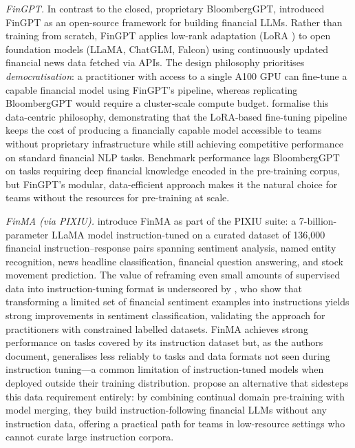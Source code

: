 \textit{FinGPT.}  In contrast to the closed, proprietary BloombergGPT,
\citet{Yang2023} introduced FinGPT as an open-source framework for
building financial LLMs.  Rather than training from scratch, FinGPT applies
low-rank adaptation (LoRA \cite{hu2022lora}) to open foundation models
(LLaMA, ChatGLM, Falcon) using continuously updated financial news data fetched
via APIs.  The design philosophy prioritises \emph{democratisation}: a practitioner
with access to a single A100 GPU can fine-tune a capable financial model using
FinGPT's pipeline, whereas replicating BloombergGPT would require a cluster-scale
compute budget.  \citet{Yang2023} formalise this data-centric philosophy,
demonstrating that the LoRA-based fine-tuning pipeline keeps the cost of
producing a financially capable model accessible to teams without proprietary
infrastructure while still achieving competitive performance on standard financial
NLP tasks.  Benchmark performance lags BloombergGPT on tasks requiring deep
financial knowledge encoded in the pre-training corpus, but FinGPT's modular,
data-efficient approach makes it the natural choice for teams without the resources
for pre-training at scale.

\textit{FinMA (via PIXIU).}  \citet{xie2023pixiu} introduce FinMA as part of
the PIXIU suite: a 7-billion-parameter LLaMA model instruction-tuned on a
curated dataset of 136,000 financial instruction--response pairs spanning
sentiment analysis, named entity recognition, news headline classification,
financial question answering, and stock movement prediction.  The value of
reframing even small amounts of supervised data into instruction-tuning format
is underscored by \citet{Zhang2023}, who show that transforming a limited set
of financial sentiment examples into instructions yields strong improvements in
sentiment classification, validating the approach for practitioners with
constrained labelled datasets.  FinMA achieves strong performance on tasks
covered by its instruction dataset but, as the authors document, generalises
less reliably to tasks and data formats not seen during instruction tuning---a
common limitation of instruction-tuned models when deployed outside their
training distribution.  \citet{Hirano2024b} propose an alternative that sidesteps
this data requirement entirely: by combining continual domain pre-training with
model merging, they build instruction-following financial LLMs without any
instruction data, offering a practical path for teams in low-resource settings
who cannot curate large instruction corpora.

